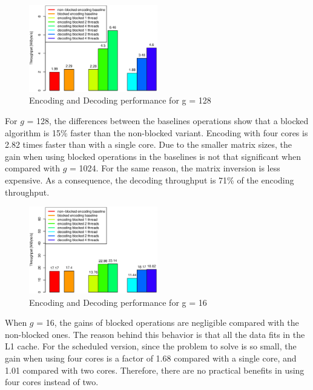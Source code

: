 \begin{figure}[h!]
\centering
\includegraphics[width=0.5\textwidth]{images/2015-04-18_encoding_decoding_128.eps}
\caption{Encoding and Decoding performance for g = 128 \cite{wunderlich2015network}}
\label{enc_dec128}
\end{figure}

For $g$ = 128, the differences between the baselines operations show that a
blocked algorithm is 15\% faster than the non-blocked variant. Encoding with
four cores is 2.82 times faster than with a single core. Due to the smaller
matrix sizes, the gain when using blocked operations in the baselines is not
that significant when compared with $g$ = 1024. For the same reason, the matrix
inversion is less expensive. As a consequence, the decoding throughput is 71\%
of the encoding throughput.

\begin{figure}[h!]
\centering
\includegraphics[width=0.5\textwidth]{images/2015-04-18_encoding_decoding_16.eps}
\caption{Encoding and Decoding performance for g = 16 \cite{wunderlich2015network}}
\label{enc_dec16}
\end{figure}

When $g$ = 16, the gains of blocked operations are negligible compared with the
non-blocked ones. The reason behind this behavior is that all the data fits in
the L1 cache. For the scheduled version, since the problem to solve is so small,
the gain when using four cores is a factor of 1.68 compared with a single core,
and 1.01 compared with two cores. Therefore, there are no practical benefits in
using four cores instead of two.

